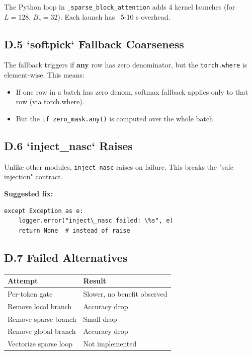 The Python loop in \texttt{\_sparse\_block\_attention} adds 4 kernel launches 
(for $L = 128$, $B_s = 32$). Each launch has ~5-10  s overhead.

\subsection{D.5 `softpick` Fallback Coarseness}

The fallback triggers if \textbf{any} row has zero denominator, but the 
\texttt{torch.where} is element-wise. This means:
\begin{itemize}
\item If one row in a batch has zero denom, softmax fallback applies only to
  that row (via torch.where).
\item But the \texttt{if zero\_mask.any()} is computed over the whole batch.

\end{itemize}
\subsection{D.6 `inject\_nasc` Raises}

Unlike other modules, \texttt{inject\_nasc} raises on failure. This breaks the 
"safe injection" contract.

\textbf{Suggested fix:}

\begin{lstlisting}
except Exception as e:
    logger.error("inject\_nasc failed: \%s", e)
    return None  # instead of raise
\end{lstlisting}

\subsection{D.7 Failed Alternatives}

\begin{table}[H]
\centering
\small
\begin{tabular}{ll}
\toprule
\textbf{Attempt} & \textbf{Result} \\
\midrule
Per-token gate & Slower, no benefit observed \\
Remove local branch & Accuracy drop \\
Remove sparse branch & Small drop \\
Remove global branch & Accuracy drop \\
Vectorize sparse loop & Not implemented \\
\bottomrule
\end{tabular}
\end{table}

